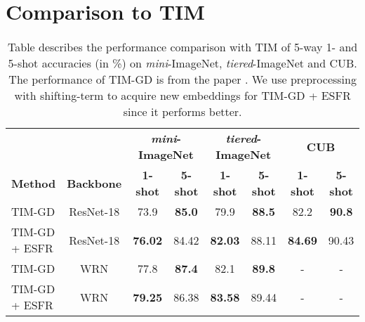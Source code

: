 \documentclass{article}
\begin{document}
\section{Comparison to TIM}
\begin{table*}[h]
	\vskip -0.2in
	\begin{small}
		\caption{Table describes the performance comparison with TIM \cite{TIM} of 5-way 1- and 5-shot accuracies (in \%) on \textit{mini}-ImageNet, \textit{tiered}-ImageNet and CUB. The performance of TIM-GD is from the paper \cite{TIM}. We use preprocessing with shifting-term to acquire new embeddings for TIM-GD + ESFR since it performs better.}
		\label{table:tim}
		\begin{center}
			\begin{tabular}{lccccccc}
				& \textbf{}         & \multicolumn{2}{c}{\textbf{\textit{mini}-ImageNet}} & \multicolumn{2}{c}{\textbf{\textit{tiered}-ImageNet}} & \multicolumn{2}{c}{\textbf{CUB}}  \\
				\textbf{Method}                           & \textbf{Backbone} & \textbf{1-shot}      & \textbf{5-shot}     & \textbf{1-shot}       & \textbf{5-shot}      & \textbf{1-shot} & \textbf{5-shot} \\ \hline
				TIM-GD \cite{TIM}                         & ResNet-18         & 73.9                 & \textbf{85.0}       & 79.9                  & \textbf{88.5}        & 82.2            & \textbf{90.8}   \\
				\rowcolor[HTML]{EFEFEF} TIM-GD + ESFR & ResNet-18         & \textbf{76.02}       & 84.42               & \textbf{82.03}        & 88.11                & \textbf{84.69}  & 90.43           \\ \hline
				TIM-GD \cite{TIM}                         & WRN               & 77.8                 & \textbf{87.4}       & 82.1                  & \textbf{89.8}        & -               & -               \\
				\rowcolor[HTML]{EFEFEF} TIM-GD + ESFR & WRN               & \textbf{79.25}       & 86.38               & \textbf{83.58}        & 89.44                & -               & -               \\ \hline
			\end{tabular}
		\end{center}
	\end{small}
	\vskip -0.1in
\end{table*}
\end{document}
